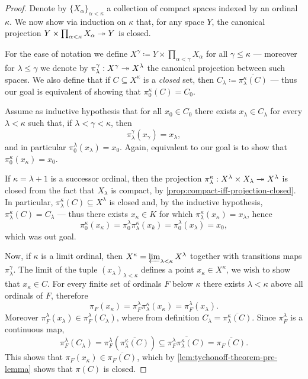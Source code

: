 \begin{proof}
Denote by \(\{X_{\alpha}\}_{\alpha < \kappa}\) a collection of compact spaces
indexed by an ordinal \(\kappa\). We now show via induction on \(\kappa\) that,
for any space \(Y\), the canonical projection
\(Y \times \prod_{\alpha < \kappa} X_{\alpha} \epi Y\) is closed.

For the ease of notation we define
\(X^{\gamma} \coloneq Y \times \prod_{\alpha < \gamma} X_{\alpha}\) for all
\(\gamma \leq \kappa\) --- moreover for \(\lambda \leq \gamma\) we denote by
\(\pi_{\lambda}^{\gamma}: X^{\gamma} \epi X^{\lambda}\) the canonical projection
between such spaces. We also define that if \(C \subseteq X^{\kappa}\) is a
\emph{closed} set, then \(C_{\lambda} \coloneq \overline{\pi_{\lambda}^{\kappa}(C)}\)
--- thus our goal is equivalent of showing that \(\pi_0^{\kappa}(C) = C_0\).

Assume as inductive hypothesis that for all \(x_0 \in C_0\) there exists
\(x_{\lambda} \in C_{\lambda}\) for every \(\lambda < \kappa\) such that, if
\(\lambda < \gamma < \kappa\), then
\[
\pi_{\lambda}^{\gamma}(x_{\gamma}) = x_{\lambda},
\]
and in particular \(\pi_0^{\lambda}(x_{\lambda}) = x_0\). Again, equivalent to
our goal is to show that \(\pi_0^{\kappa}(x_{\kappa}) = x_0\).

If \(\kappa = \lambda + 1\) is a successor ordinal, then the projection
\(\pi_{\lambda}^{\kappa}: X^{\lambda} \times X_{\lambda} \epi X^{\lambda}\) is
closed from the fact that \(X_{\lambda}\) is compact, by
\cref{prop:compact-iff-projection-closed}. In particular,
\(\pi_{\lambda}^{\kappa}(C) \subseteq X^{\lambda}\) is closed and, by the
inductive hypothesis, \(\pi_{\lambda}^{\kappa}(C) = C_{\lambda}\) --- thus there
exists \(x_{\kappa} \in K\) for which
\(\pi_{\lambda}^{\kappa}(x_{\kappa}) = x_{\lambda}\), hence
\[
\pi_0^{\kappa}(x_{\kappa})
= \pi_0^{\lambda} \pi_{\lambda}^{\kappa}(x_k)
= \pi_0^{\lambda}(x_{\lambda})
= x_0,
\]
which was out goal.

Now, if \(\kappa\) is a limit ordinal, then
\(X^{\kappa} = \projlim_{\lambda < \kappa} X^{\lambda}\) together with
transitions maps \(\pi_{\lambda}^{\gamma}\). The limit of the tuple
\((x_{\lambda})_{\lambda < \kappa}\) defines a point
\(x_{\kappa} \in X^\kappa\), we wish to show that \(x_{\kappa} \in C\). For
every finite set of ordinals \(F\) below \(\kappa\) there exists
\(\lambda < \kappa\) above all ordinals of \(F\), therefore
\[
\pi_F(x_{\kappa})
= \pi_F^{\lambda}\pi_{\lambda}^{\kappa}(x_{\kappa})
= \pi_F^{\lambda}(x_{\lambda}).
\]
Moreover \(\pi_F^{\lambda}(x_{\lambda}) \in \pi_F^{\lambda}(C_{\lambda})\),
where from definition \(C_{\lambda} =
\overline{\pi_{\lambda}^{\kappa}(C)}\). Since \(\pi_F^{\lambda}\) is a
continuous map,
\[
\pi_F^{\lambda}(C_{\lambda})
= \pi_F^{\lambda}(\overline{\pi_{\lambda}^{\kappa}(C)})
\subseteq \overline{\pi_F^{\lambda} \pi_{\lambda}^{\kappa}(C)}
= \overline{\pi_F(C)}.
\]
This shows that \(\pi_F(x_{\kappa}) \in \overline{\pi_F(C)}\), which by
\cref{lem:tychonoff-theorem-pre-lemma} shows that \(\pi(C)\) is closed.
\end{proof}

